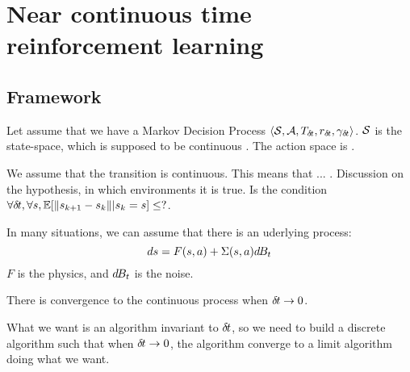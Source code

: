 \section{Near continuous time reinforcement learning}
\label{sec:continous}

\subsection{Framework}

Let assume that we have a Markov Decision Process  $\langle {\cal S}, {\cal A}, T_{{\delta\hspace{-.1em}t}}, r_{\delta\hspace{-.1em}t}, \gamma_{\delta\hspace{-.1em}t}\rangle$. ${\cal S}$ is the state-space, which is supposed to be continuous . The action space is .

We assume that the transition is continuous. This means that ... . Discussion on the hypothesis, in which environments it is true. Is the condition $\forall {\delta\hspace{-.1em}t}, \forall s, \mathbb{E}[\|s_{k+1} - s_k \||s_k = s] \leq ?$. 

In many situations, we can assume that there is an uderlying process:
\begin{equation}
  \label{eq:diffusion}
  ds = F(s, a) + \Sigma(s, a)d\hspace{-.1em}B_t
\end{equation}
$F$ is the physics, and $d\hspace{-.1em}B_t$ is the noise.

There is convergence to the continuous process when ${\delta\hspace{-.1em}t} \rightarrow 0$.

What we want is an algorithm invariant to ${\delta\hspace{-.1em}t}$, so we need to build a discrete algorithm such that when ${\delta\hspace{-.1em}t} \rightarrow 0$, the algorithm converge to a limit algorithm doing what we want.

